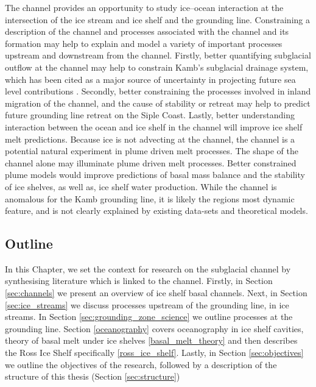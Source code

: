 
The channel provides an opportunity to study ice--ocean interaction at the intersection of the ice stream and ice shelf and the grounding line.  Constraining a description of the channel and processes associated with the channel and its formation may help to explain and model a variety of important processes upstream and downstream from the channel. Firstly, better quantifying subglacial outflow at the channel may help to constrain Kamb's subglacial drainage system, which has been cited as a major source of uncertainty in projecting future sea level contributions \citep{bougamont2015reactivation}. Secondly, better constraining the processes involved in inland migration of the channel, and the cause of stability or retreat may help to predict future grounding line retreat on the Siple Coast. Lastly, better understanding interaction between the ocean and ice shelf in the channel will improve ice shelf melt predictions.  Because ice is not advecting at the channel, the channel is a potential natural experiment in plume driven melt processes. The shape of the channel alone may illuminate plume driven melt processes.  Better constrained plume models would improve predictions of basal mass balance and the stability of ice shelves, as well as, ice shelf water production.  While the channel is anomalous for the Kamb grounding line, it is likely the regions most dynamic feature, and is not clearly explained by existing data-sets and theoretical models.

\subsection{Outline}

In this Chapter, we set the context for research on the subglacial channel by synthesising literature which is linked to the channel. Firstly, in Section \ref{sec:channels} we present an overview of ice shelf basal channels.  Next, in Section \ref{sec:ice_streams} we discuss processes upstream of the grounding line, in ice streams. In Section \ref{sec:grounding_zone_science} we outline processes at the grounding line. Section \ref{oceanography} covers oceanography in ice shelf cavities, theory of basal melt under ice shelves \ref{basal_melt_theory} and then describes the Ross Ice Shelf specifically \ref{ross_ice_shelf}. Lastly, in Section \ref{sec:objectives} we outline the objectives of the research, followed by a description of the structure of this thesis (Section \ref{sec:structure})

